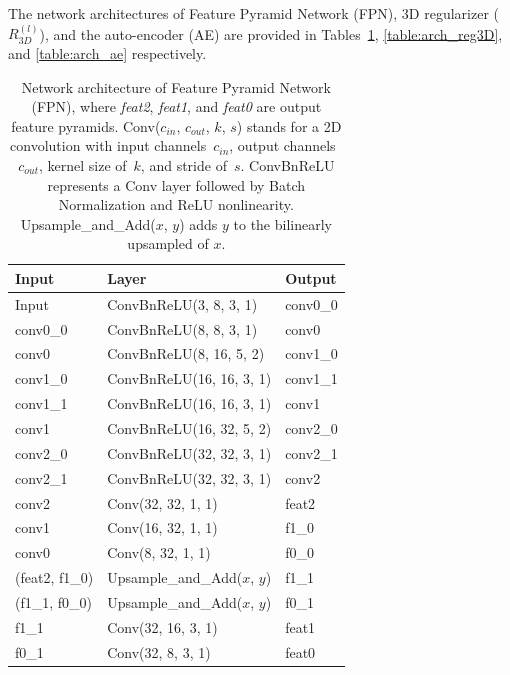 The network architectures of Feature Pyramid Network (FPN), 3D regularizer ($R^{(l)}_{3D}$), and the auto-encoder (AE) are provided in Tables~\ref{table:arch_fpn}, \ref{table:arch_reg3D}, and \ref{table:arch_ae} respectively.

\begin{table}[!t]
    \begin{center}
        \begin{threeparttable}
            \begin{tabular}{lll}
            Input &  Layer & Output  \\
            \hline
            Input & ConvBnReLU(3, 8, 3, 1) & conv0\_0  \\
            conv0\_0 & ConvBnReLU(8, 8, 3, 1) & conv0 \\
            conv0 & ConvBnReLU(8, 16, 5, 2) & conv1\_0 \\
            conv1\_0 & ConvBnReLU(16, 16, 3, 1) & conv1\_1 \\
            conv1\_1 & ConvBnReLU(16, 16, 3, 1) & conv1 \\
            conv1 & ConvBnReLU(16, 32, 5, 2) & conv2\_0 \\
            conv2\_0 & ConvBnReLU(32, 32, 3, 1) & conv2\_1 \\
            conv2\_1 & ConvBnReLU(32, 32, 3, 1) & conv2 \\
            conv2 & Conv(32, 32, 1, 1) & feat2 \\
            conv1 & Conv(16, 32, 1, 1) & f1\_0 \\
            conv0 & Conv(8, 32, 1, 1) & f0\_0 \\
            (feat2, f1\_0) & Upsample\_and\_Add($x$, $y$) & f1\_1 \\
            (f1\_1, f0\_0) & Upsample\_and\_Add($x$, $y$) & f0\_1 \\
            f1\_1 & Conv(32, 16, 3, 1) & feat1 \\
            f0\_1 & Conv(32, 8, 3, 1) & feat0 \\
            \hline
            \end{tabular}
        \end{threeparttable}
    \end{center}
    \caption{Network architecture of Feature Pyramid Network (FPN), where \textit{feat2}, \textit{feat1}, and \textit{feat0} are output feature pyramids. Conv($c_{in}$, $c_{out}$, $k$, $s$) stands for a 2D convolution with input channels~$c_{in}$, output channels~$c_{out}$, kernel size of~$k$, and stride of~$s$. ConvBnReLU represents a Conv layer followed by Batch Normalization and ReLU nonlinearity. Upsample\_and\_Add($x$, $y$) adds $y$ to the bilinearly upsampled of $x$.}
    \label{table:arch_fpn}
    \vspace{4ex}
\end{table}


